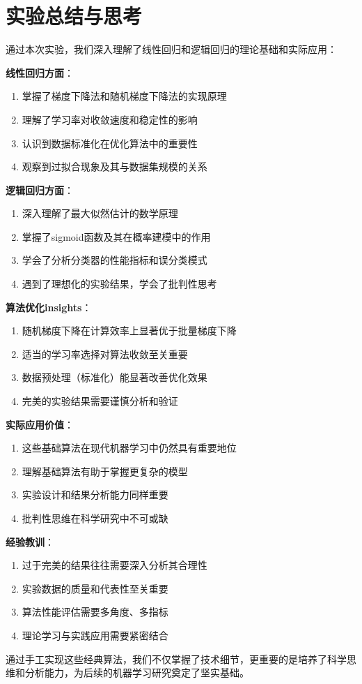 \documentclass[a4paper]{article}
\begin{document}
\section{实验总结与思考}

通过本次实验，我们深入理解了线性回归和逻辑回归的理论基础和实际应用：

\textbf{线性回归方面}：
\begin{enumerate}
    \item 掌握了梯度下降法和随机梯度下降法的实现原理
    \item 理解了学习率对收敛速度和稳定性的影响
    \item 认识到数据标准化在优化算法中的重要性
    \item 观察到过拟合现象及其与数据集规模的关系
\end{enumerate}

\textbf{逻辑回归方面}：
\begin{enumerate}
    \item 深入理解了最大似然估计的数学原理
    \item 掌握了sigmoid函数及其在概率建模中的作用
    \item 学会了分析分类器的性能指标和误分类模式
    \item 遇到了理想化的实验结果，学会了批判性思考
\end{enumerate}

\textbf{算法优化insights}：
\begin{enumerate}
    \item 随机梯度下降在计算效率上显著优于批量梯度下降
    \item 适当的学习率选择对算法收敛至关重要
    \item 数据预处理（标准化）能显著改善优化效果
    \item 完美的实验结果需要谨慎分析和验证
\end{enumerate}

\textbf{实际应用价值}：
\begin{enumerate}
    \item 这些基础算法在现代机器学习中仍然具有重要地位
    \item 理解基础算法有助于掌握更复杂的模型
    \item 实验设计和结果分析能力同样重要
    \item 批判性思维在科学研究中不可或缺
\end{enumerate}

\textbf{经验教训}：
\begin{enumerate}
    \item 过于完美的结果往往需要深入分析其合理性
    \item 实验数据的质量和代表性至关重要
    \item 算法性能评估需要多角度、多指标
    \item 理论学习与实践应用需要紧密结合
\end{enumerate}

通过手工实现这些经典算法，我们不仅掌握了技术细节，更重要的是培养了科学思维和分析能力，为后续的机器学习研究奠定了坚实基础。
\end{document}
